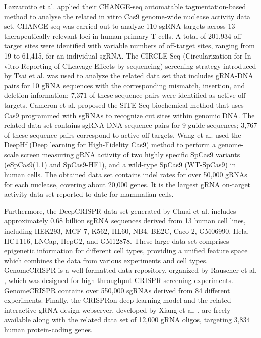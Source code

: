 \documentclass[unnumsec,webpdf,contemporary,large]{oup-authoring-template}
\theoremstyle{thmstyleone}%
\theoremstyle{thmstyletwo}%
\theoremstyle{thmstylethree}%
\begin{document}
Lazzarotto et al. \cite{lazzarotto2020change} applied their CHANGE-seq automatable tagmentation-based method to analyse the related in vitro Cas9 genome-wide nuclease activity data set. CHANGE-seq was carried out to analyze 110 sgRNA targets across 13 therapeutically relevant loci in human primary T cells. A total of 201,934 off-target sites were identified with variable numbers of off-target sites, ranging from 19 to 61,415, for an individual sgRNA. The CIRCLE-Seq (Circularization for In vitro Reporting of CLeavage Effects by sequencing) screening strategy introduced by Tsai et al. \cite{tsai2017circle} was used to analyze the related data set that includes gRNA-DNA pairs for 10 gRNA sequences with the corresponding mismatch, insertion, and deletion information; 7,371 of these sequence pairs were identified as active off-targets. Cameron et al. \cite{cameron2017mapping} proposed the SITE-Seq biochemical method that uses Cas9 programmed with sgRNAs to recognize cut sites within genomic DNA. The related data set contains sgRNA-DNA sequence pairs for 9 guide sequences; 3,767 of these sequence pairs correspond to active off-targets. Wang et al. \cite{wang2019optimized} used the DeepHf (Deep learning for High-Fidelity Cas9) method to perform a genome-scale screen measuring gRNA activity of two highly specific SpCas9 variants (eSpCas9(1.1) and SpCas9-HF1), and a wild-type SpCas9 (WT-SpCas9) in human cells. The obtained data set contains indel rates for over 50,000 gRNAs for each nuclease, covering about 20,000 genes. It is the largest gRNA on-target activity data set reported to date for mammalian cells. 

Furthermore, the DeepCRISPR data set generated by Chuai et al. \cite{chuai2018deepcrispr} includes approximately $0.68$ billion sgRNA sequences derived from 13 human cell lines, including HEK293, MCF-7, K562, HL60, NB4, BE2C, Caco-2, GM06990, Hela, HCT116, LNCap, HepG2, and GM12878. These large data set comprises epigenetic information for different cell types, providing a unified feature space which combines the data from various experiments and cell types. GenomeCRISPR is a well-formatted data repository, organized by Rauscher et al. \cite{rauscher2016genomecrispr}, which was designed for high-throughput CRISPR screening experiments. GenomeCRISPR contains over 550,000 sgRNAs derived from 84 different experiments. Finally, the CRISPRon deep learning model and the related interactive gRNA design webserver, developed by Xiang et al. \cite{xiang2021enhancing}, are freely available along with the related data set of 12,000 gRNA oligos, targeting 3,834 human protein-coding genes. 
\end{document}
